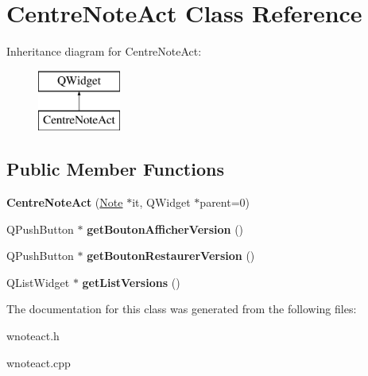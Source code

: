 \hypertarget{class_centre_note_act}{}\section{Centre\+Note\+Act Class Reference}
\label{class_centre_note_act}
Inheritance diagram for Centre\+Note\+Act\+:\begin{figure}[H]
\begin{center}
\leavevmode
\includegraphics[height=2.000000cm]{class_centre_note_act}
\end{center}
\end{figure}
\subsection*{Public Member Functions}
\begin{DoxyCompactItemize}
\item 
\mbox{\label{class_centre_note_act_ac77aaaac64ef24e9fb37f60113e7457c}} 
{\bfseries Centre\+Note\+Act} (\hyperlink{class_note}{Note} $\ast$it, Q\+Widget $\ast$parent=0)
\item 
\mbox{\label{class_centre_note_act_ae4e63afb8943914798c52a0b5d2f41c8}} 
Q\+Push\+Button $\ast$ {\bfseries get\+Bouton\+Afficher\+Version} ()
\item 
\mbox{\label{class_centre_note_act_a76122ca16510ed8a04ecf2725f9a1d16}} 
Q\+Push\+Button $\ast$ {\bfseries get\+Bouton\+Restaurer\+Version} ()
\item 
\mbox{\label{class_centre_note_act_ab623b36f37425a8abe9e0fbad8c58503}} 
Q\+List\+Widget $\ast$ {\bfseries get\+List\+Versions} ()
\end{DoxyCompactItemize}


The documentation for this class was generated from the following files\+:\begin{DoxyCompactItemize}
\item 
wnoteact.\+h\item 
wnoteact.\+cpp\end{DoxyCompactItemize}
